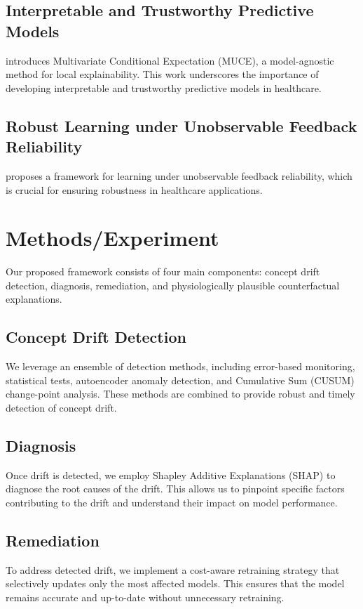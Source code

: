 \documentclass{article}
\begin{document}
\subsection{Interpretable and Trustworthy Predictive Models}
\cite{ruizespaña2026explainingmachinelearningpredictive} introduces Multivariate Conditional Expectation (MUCE), a model-agnostic method for local explainability. This work underscores the importance of developing interpretable and trustworthy predictive models in healthcare.

\subsection{Robust Learning under Unobservable Feedback Reliability}
\cite{zhang2026learningtrustexperiencemonitortrustregulator} proposes a framework for learning under unobservable feedback reliability, which is crucial for ensuring robustness in healthcare applications.

\section{Methods/Experiment}
Our proposed framework consists of four main components: concept drift detection, diagnosis, remediation, and physiologically plausible counterfactual explanations. 

\subsection{Concept Drift Detection}
We leverage an ensemble of detection methods, including error-based monitoring, statistical tests, autoencoder anomaly detection, and Cumulative Sum (CUSUM) change-point analysis. These methods are combined to provide robust and timely detection of concept drift.

\subsection{Diagnosis}
Once drift is detected, we employ Shapley Additive Explanations (SHAP) to diagnose the root causes of the drift. This allows us to pinpoint specific factors contributing to the drift and understand their impact on model performance.

\subsection{Remediation}
To address detected drift, we implement a cost-aware retraining strategy that selectively updates only the most affected models. This ensures that the model remains accurate and up-to-date without unnecessary retraining.
\end{document}
